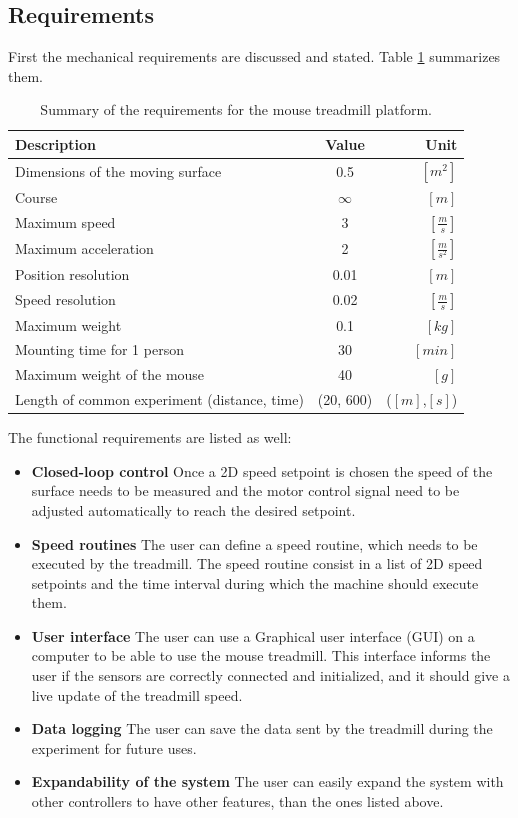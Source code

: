 \documentclass[12pt,a4paper, twoside]{article}
\begin{document}
\subsection{Requirements}
First the mechanical requirements are discussed and stated. Table \ref{tab:Requirements} summarizes them.
\begin{table}[H]
	\centering
	\begin{tabular}{l||c|r} 
		\textbf{Description}&\textbf{Value}  &\textbf{Unit}  \\ 
		\hline
		\hline 
		Dimensions of the moving surface & 0.5 & $[m^2]$ \\ 
		\hline 
		Course & $\infty$  & $[m]$  \\ 
		\hline 
		Maximum speed & 3 & $[\frac{m}{s}]$ \\ 
		\hline 
		Maximum acceleration & 2 & $[\frac{m}{s^2}]$  \\ 
		\hline 
		Position resolution & 0.01 & $[m]$  \\ 
		\hline 
		Speed resolution & 0.02  & $[\frac{m}{s}]$  \\ 
		\hline 
		Maximum weight & 0.1  & $[kg]$  \\  
		\hline 
		Mounting time for 1 person & 30 & $[min]$  \\
		\hline 
		Maximum weight of the mouse & 40  & $[g]$ \\
		\hline 
		Length of common experiment (distance, time) & (20, 600)  & ($[m]$,$[s]$)  \\
	\end{tabular} 
	\caption{Summary of the requirements for the mouse treadmill platform.}
	\label{tab:Requirements}
\end{table}
The functional requirements are listed as well:
\begin{itemize}
	\item \textbf{Closed-loop control} Once a 2D speed setpoint is chosen the speed of the surface needs to be measured and the motor control signal need to be adjusted automatically to reach the desired setpoint. 
	\item \textbf{Speed routines} The user can define a speed routine, which needs to be executed by the treadmill. The speed routine consist in a list of 2D speed setpoints and the time interval during which the machine should execute them.
	\item \textbf{User interface} The user can use a Graphical user interface (GUI) on a computer to be able to use the mouse treadmill. This interface informs the user if the sensors are correctly connected and initialized, and it should give a live update of the treadmill speed.
	\item \textbf{Data logging} The user can save the data sent by the treadmill during the experiment for future uses. 
	\item \textbf{Expandability of the system} The user can easily expand the system with other controllers to have other features, than the ones listed above.
\end{itemize}
\end{document}
